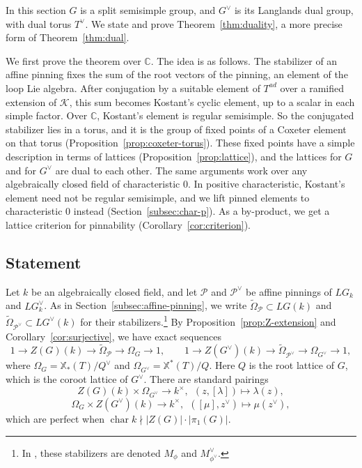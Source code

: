 \documentclass[psamsfonts]{amsart}
\theoremstyle{definition}
\theoremstyle{remark}
\numberwithin{equation}{section}
\newcommand{\X}{\mathbb{X}}
\newcommand{\ra}{\rightarrow}
\newcommand{\tOm}{\widetilde{\Omega}}
\DeclareMathOperator{\chara}{char}
\newcommand\cK{\mathcal{K}}
\newcommand\cP{\mathcal{P}}
\newcommand{\CC}{\mathbb{C}}
\numberwithin{equation}{section}
\newcommand{\Om}{\Omega}
\theoremstyle{plain}
\begin{document}
In this section $G$ is a split semisimple group, and $G^\vee$ is its Langlands dual group, with dual torus $T^\vee$. We state and prove Theorem~\ref{thm:duality}, a more precise form of Theorem~\ref{thm:dual}.

We first prove the theorem over $\CC$. The idea is as follows. The stabilizer of an affine pinning fixes the sum of the root vectors of the pinning, an element of the loop Lie algebra. After conjugation by a suitable element of $T^{ad}$ over a ramified extension of $\cK$, this sum becomes Kostant's cyclic element, up to a scalar in each simple factor. Over $\CC$, Kostant's element is regular semisimple. So the conjugated stabilizer lies in a torus, and it is the group of fixed points of a Coxeter element on that torus (Proposition~\ref{prop:coxeter-torus}). These fixed points have a simple description in terms of lattices (Proposition~\ref{prop:lattice}), and the lattices for $G$ and for $G^\vee$ are dual to each other. The same arguments work over any algebraically closed field of characteristic $0$. In positive characteristic, Kostant's element need not be regular semisimple, and we lift pinned elements to characteristic $0$ instead (Section~\ref{subsec:char-p}). As a by-product, we get a lattice criterion for pinnability (Corollary~\ref{cor:criterion}).

\subsection{Statement}\label{subsec:dual-statement}
Let $k$ be an algebraically closed field, and let $\cP$ and $\cP^\vee$ be affine pinnings of $LG_k$ and $LG^\vee_k$. As in Section~\ref{subsec:affine-pinning}, we write $\tOm_\cP\subset LG(k)$ and $\tOm_{\cP^\vee}\subset LG^\vee(k)$ for their stabilizers.\footnote{In \cite{DLYZ}, these stabilizers are denoted $M_\phi$ and $M^\vee_{\phi^\vee}$.} By Proposition~\ref{prop:Z-extension} and Corollary~\ref{cor:surjective}, we have exact sequences
\[
1\ra Z(G)(k)\ra \tOm_\cP\ra\Om_G\ra1,\qquad 1\ra Z(G^\vee)(k)\ra \tOm_{\cP^\vee}\ra\Om_{G^\vee}\ra1,
\]
where $\Om_G=\X_*(T)/Q^\vee$ and $\Om_{G^\vee}=\X^*(T)/Q$. Here $Q$ is the root lattice of $G$, which is the coroot lattice of $G^\vee$. There are standard pairings
\[
Z(G)(k)\times\Om_{G^\vee}\ra k^\times,\ \ (z,[\lambda])\mapsto\lambda(z),
\]
\[
\Om_G\times Z(G^\vee)(k)\ra k^\times,\ \ ([\mu],z^\vee)\mapsto\mu(z^\vee),
\]
which are perfect when $\chara k\nmid|Z(G)|\cdot|\pi_1(G)|$.
\end{document}
